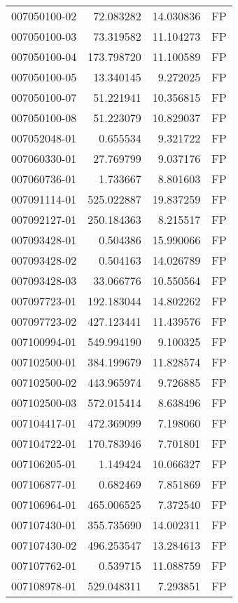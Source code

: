 \begin{tabular}{lrrl}
007050100-02 &   72.083282 &    14.030836 &   FP \\
007050100-03 &   73.319582 &    11.104273 &   FP \\
007050100-04 &  173.798720 &    11.100589 &   FP \\
007050100-05 &   13.340145 &     9.272025 &   FP \\
007050100-07 &   51.221941 &    10.356815 &   FP \\
007050100-08 &   51.223079 &    10.829037 &   FP \\
007052048-01 &    0.655534 &     9.321722 &   FP \\
007060330-01 &   27.769799 &     9.037176 &   FP \\
007060736-01 &    1.733667 &     8.801603 &   FP \\
007091114-01 &  525.022887 &    19.837259 &   FP \\
007092127-01 &  250.184363 &     8.215517 &   FP \\
007093428-01 &    0.504386 &    15.990066 &   FP \\
007093428-02 &    0.504163 &    14.026789 &   FP \\
007093428-03 &   33.066776 &    10.550564 &   FP \\
007097723-01 &  192.183044 &    14.802262 &   FP \\
007097723-02 &  427.123441 &    11.439576 &   FP \\
007100994-01 &  549.994190 &     9.100325 &   FP \\
007102500-01 &  384.199679 &    11.828574 &   FP \\
007102500-02 &  443.965974 &     9.726885 &   FP \\
007102500-03 &  572.015414 &     8.638496 &   FP \\
007104417-01 &  472.369099 &     7.198060 &   FP \\
007104722-01 &  170.783946 &     7.701801 &   FP \\
007106205-01 &    1.149424 &    10.066327 &   FP \\
007106877-01 &    0.682469 &     7.851869 &   FP \\
007106964-01 &  465.006525 &     7.372540 &   FP \\
007107430-01 &  355.735690 &    14.002311 &   FP \\
007107430-02 &  496.253547 &    13.284613 &   FP \\
007107762-01 &    0.539715 &    11.088759 &   FP \\
007108978-01 &  529.048311 &     7.293851 &   FP \\

\end{tabular}
